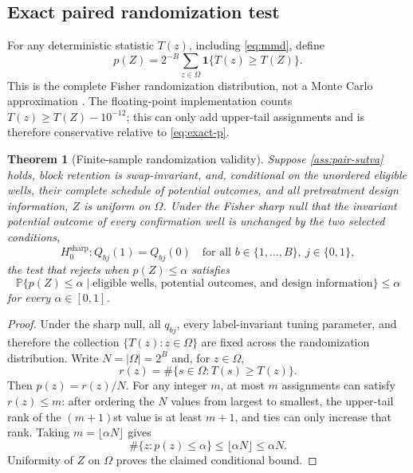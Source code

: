 \documentclass[11pt]{article}
\newtheorem{theorem}{Theorem}[section]
\theoremstyle{definition}
\theoremstyle{remark}
\newcommand{\bP}{\mathbb P}
\newcommand{\1}{\mathbf 1}
\begin{document}
\subsection{Exact paired randomization test}

For any deterministic statistic \(T(z)\), including \eqref{eq:mmd}, define
\begin{equation}\label{eq:exact-p}
 p(Z)=2^{-B}\sum_{z\in\Omega}
 \1\{T(z)\ge T(Z)\}.
\end{equation}
This is the complete Fisher randomization distribution, not a Monte Carlo
approximation \citep{fisher1935design,lehmann2005testing}.
The floating-point implementation counts
\(T(z)\ge T(Z)-10^{-12}\); this can only add upper-tail assignments and is
therefore conservative relative to \eqref{eq:exact-p}.

\begin{theorem}[Finite-sample randomization validity]\label{thm:randomization}
Suppose \cref{ass:pair-sutva} holds, block retention is swap-invariant, and,
conditional on the unordered eligible wells, their complete schedule of
potential outcomes, and all pretreatment design information, \(Z\) is uniform
on \(\Omega\).
Under the Fisher sharp null that the invariant potential outcome of every
confirmation well is unchanged by the two selected conditions,
\[
  H_0^{\mathrm{sharp}}:
  Q_{bj}(1)=Q_{bj}(0)
  \quad\text{for all }b\in\{1,\ldots,B\},\ j\in\{0,1\},
\]
the test that rejects when \(p(Z)\le\alpha\) satisfies
\[
\bP\{p(Z)\le\alpha\mid
\text{eligible wells, potential outcomes, and design information}\}
 \le\alpha
\]
for every \(\alpha\in[0,1]\).
\end{theorem}

\begin{proof}
Under the sharp null, all \(q_{bj}\), every label-invariant tuning parameter,
and therefore the collection \(\{T(z):z\in\Omega\}\) are fixed across the
randomization distribution.  Write \(N=|\Omega|=2^B\) and, for \(z\in\Omega\),
\[
 r(z)=\#\{s\in\Omega:T(s)\ge T(z)\}.
\]
Then \(p(z)=r(z)/N\).  For any integer \(m\), at most \(m\) assignments can
satisfy \(r(z)\le m\): after ordering the \(N\) values from largest to smallest,
the upper-tail rank of the \((m+1)\)st value is at least \(m+1\), and ties can
only increase that rank.  Taking \(m=\lfloor\alpha N\rfloor\) gives
\[
 \#\{z:p(z)\le\alpha\}\le\lfloor\alpha N\rfloor\le\alpha N.
\]
Uniformity of \(Z\) on \(\Omega\) proves the claimed conditional bound.
\end{proof}
\end{document}
